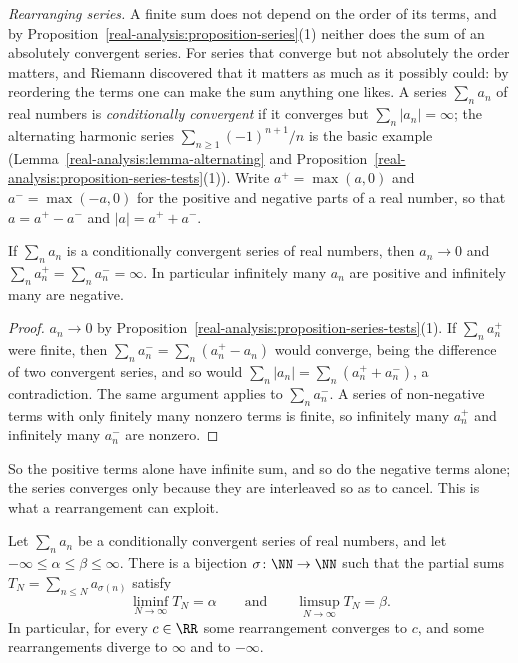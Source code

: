 \emph{Rearranging series.} A finite sum does not depend on the order of its terms, and by Proposition~\ref{real-analysis:proposition-series}(1) neither does the sum of an absolutely convergent
series. For series that converge but not absolutely the order matters, and Riemann discovered that it matters as much as it possibly could: by reordering the terms one can make the sum anything
one likes. A series $\sum_na_n$ of real numbers is \emph{conditionally convergent} if it converges but $\sum_n|a_n| = \infty$; the alternating harmonic series $\sum_{n \geq 1}(-1)^{n+1}/n$ is the basic
example (Lemma~\ref{real-analysis:lemma-alternating} and Proposition~\ref{real-analysis:proposition-series-tests}(1)). Write $a^+ = \max(a, 0)$ and $a^- = \max(-a, 0)$ for the positive and negative parts
of a real number, so that $a = a^+ - a^-$ and $|a| = a^+ + a^-$.

\begin{lemma}\label{real-analysis:lemma-conditional-parts}
If $\sum_na_n$ is a conditionally convergent series of real numbers, then $a_n \to 0$ and $\sum_na_n^+ = \sum_na_n^- = \infty$. In particular infinitely many $a_n$ are positive and infinitely
many are negative.
\end{lemma}

\begin{proof}
$a_n \to 0$ by Proposition~\ref{real-analysis:proposition-series-tests}(1). If $\sum_na_n^+$ were finite, then $\sum_na_n^- = \sum_n(a_n^+ - a_n)$ would converge, being the difference of two
convergent series, and so would $\sum_n|a_n| = \sum_n(a_n^+ + a_n^-)$, a contradiction. The same argument applies to $\sum_na_n^-$. A series of non-negative terms with only finitely many nonzero
terms is finite, so infinitely many $a_n^+$ and infinitely many $a_n^-$ are nonzero.
\end{proof}

So the positive terms alone have infinite sum, and so do the negative terms alone; the series converges only because they are interleaved so as to cancel. This is what a rearrangement can
exploit.

\begin{theorem}\label{real-analysis:theorem-riemann-rearrangement}
Let $\sum_na_n$ be a conditionally convergent series of real numbers, and let $-\infty \leq \alpha \leq \beta \leq \infty$. There is a bijection $\sigma \colon \NN \to \NN$ such that the partial sums
$T_N = \sum_{n \leq N}a_{\sigma(n)}$ satisfy
\[
\liminf_{N \to \infty}T_N = \alpha \qquad\text{and}\qquad \limsup_{N \to \infty}T_N = \beta .
\]
In particular, for every $c \in \RR$ some rearrangement converges to $c$, and some rearrangements diverge to $\infty$ and to $-\infty$.
\end{theorem}

